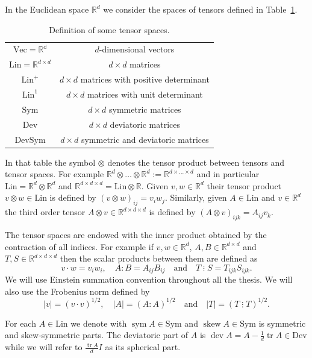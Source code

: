 \documentclass[a4paper,10pt,twoside]{amsbook}
\numberwithin{section}{chapter}
\numberwithin{equation}{chapter}
\theoremstyle{definition}
\DeclareMathOperator{\dev}{dev}
\DeclareMathOperator{\tr}{tr}
\DeclareMathOperator{\sym}{sym}
\DeclareMathOperator{\ske}{skew}
\newcommand{\threedots}{\mathbin{\vdots}}
\begin{document}
In the Euclidean space $\mathbb{R}^d$ we consider the spaces of tensors defined in Table~\ref{tab:tensors}.
\begin{table}
\caption{Definition of some tensor spaces.}
\label{tab:tensors}
\begin{tabular}{cc}
\toprule
$\text{Vec}=\mathbb{R^d}$ & $d$-dimensional vectors \\
$\text{Lin}=\mathbb{R}^{d\times d}$ & $d\times d$ matrices \\
$\text{Lin}^+$ & $d\times d$ matrices with positive determinant \\
$\text{Lin}^1$ & $d\times d$ matrices with unit determinant \\
$\text{Sym}$ & $d\times d$ symmetric matrices \\
$\text{Dev}$ & $d\times d$ deviatoric matrices \\
$\text{DevSym}$ & $d\times d$ symmetric and deviatoric matrices \\
\bottomrule
\end{tabular}
\end{table}
In that table the symbol $\otimes$ denotes the tensor product between tensors and tensor spaces. For example $\mathbb{R}^d\otimes\dots\otimes\mathbb{R}^d:=\mathbb{R}^{d\times\dots\times d}$ and in particular $\text{Lin}=\mathbb{R}^d\otimes\mathbb{R}^d$ and $\mathbb{R}^{d\times d\times d}=\text{Lin}\otimes\mathbb{R}$. Given $v,w\in\mathbb{R}^d$ their tensor product $v\otimes w\in\text{Lin}$ is defined by $(v\otimes w)_{ij}=v_iw_j$. Similarly, given $A\in\text{Lin}$ and $v\in\mathbb{R}^d$ the third order tensor $A\otimes v\in\mathbb{R}^{d\times d\times d}$ is defined by $(A\otimes v)_{ijk}=A_{ij}v_k$.

The tensor spaces are endowed with the inner product obtained by the contraction of all indices. For example if $v,w\in\mathbb{R}^d$, $A,B\in\mathbb{R}^{d\times d}$ and $T,S\in\mathbb{R}^{d\times d\times d}$ then the scalar products between them are defined as
\[
v\cdot w=v_iw_i,\quad A:B=A_{ij}B_{ij}\quad\text{and}\quad T\threedots S=T_{ijk}S_{ijk}.
\]
We will use Einstein summation convention throughout all the thesis. We will also use the Frobenius norm defined by
\[
|v|=(v\cdot v)^{1/2},\quad|A|=(A:A)^{1/2}\quad\text{and}\quad|T|=(T\threedots T)^{1/2}.
\]

For each $A\in\text{Lin}$ we denote with $\sym A\in\text{Sym}$ and $\ske A\in\text{Sym}$ is symmetric and skew-symmetric parts. The deviatoric part of $A$ is $\dev A=A-\frac{1}{d}\tr A\in\text{Dev}$ while we will refer to $\frac{\tr A}{d}I$ as its spherical part.
\end{document}
